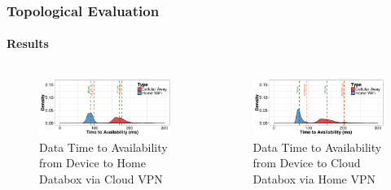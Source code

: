 \documentclass[aspectratio=169]{beamer}
\begin{document}
\begin{frame}
	\frametitle{Topological Evaluation}
	\framesubtitle{Results}

	\begin{columns}[c]
		\begin{figure}
			\centering
			\includegraphics[width=\columnwidth]{acc-inout-cloud-home}
			\caption{Data Time to Availability from Device to Home Databox via Cloud VPN}
		\end{figure}
		\begin{figure}
			\centering
			\includegraphics[width=\columnwidth]{acc-inout-home-cloud}
			\caption{Data Time to Availability from Device to Cloud Databox via Home VPN}
		\end{figure}
	\end{columns}
\end{frame}
\end{document}
